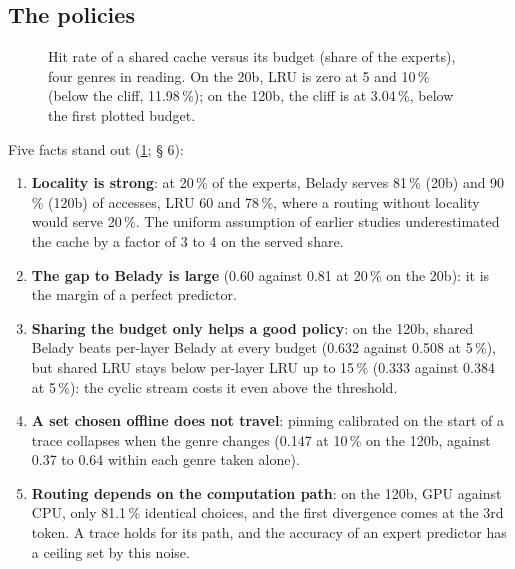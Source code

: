 \subsection{The policies}

\begin{figure}[ht]
\centering
\GrapheCchSucces
\caption[Hit rate versus budget, five policies]{Hit rate of a shared cache versus its budget (share of the experts), four genres in reading. On the 20b, LRU is zero at 5 and 10\,\% (below the cliff, 11.98\,\%); on the 120b, the cliff is at 3.04\,\%, below the first plotted budget.}
\label{fig:t2o-succes}
\end{figure}

Five facts stand out (\cref{fig:t2o-succes};  § 6):
\begin{enumerate}
\item \textbf{Locality is strong}: at 20\,\% of the experts, Belady serves 81\,\% (20b) and 90\,\% (120b) of accesses, LRU 60 and 78\,\%, where a routing without locality would serve 20\,\%. The uniform assumption of earlier studies underestimated the cache by a factor of 3 to 4 on the served share.
\item \textbf{The gap to Belady is large} (0.60 against 0.81 at 20\,\% on the 20b): it is the margin of a perfect predictor.
\item \textbf{Sharing the budget only helps a good policy}: on the 120b, shared Belady beats per-layer Belady at every budget (0.632 against 0.508 at 5\,\%), but shared LRU stays below per-layer LRU up to 15\,\% (0.333 against 0.384 at 5\,\%): the cyclic stream costs it even above the threshold.
\item \textbf{A set chosen offline does not travel}: pinning calibrated on the start of a trace collapses when the genre changes (0.147 at 10\,\% on the 120b, against 0.37 to 0.64 within each genre taken alone).
\item \textbf{Routing depends on the computation path}: on the 120b, GPU against CPU, only 81.1\,\% identical choices, and the first divergence comes at the 3rd token. A trace holds for its path, and the accuracy of an expert predictor has a ceiling set by this noise.
\end{enumerate}

